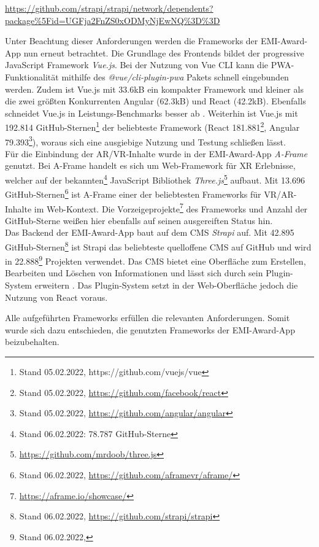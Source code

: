 \urldef\strapidep\url{https://github.com/strapi/strapi/network/dependents?package%5Fid=UGFja2FnZS0xODMyNjEwNQ%3D%3D}

Unter Beachtung dieser Anforderungen werden die Frameworks der EMI-Award-App nun
erneut betrachtet. Die Grundlage des Frontends bildet der progressive JavaScript
Framework \textit{Vue.js}. Bei der Nutzung von Vue CLI kann die
PWA-Funktionalität mithilfe des \textit{@vue/cli-plugin-pwa} Pakets schnell
eingebunden werden. Zudem ist Vue.js mit 33.6kB \cite[{v3.2.29, minifiziert und
            komprimiert}]{Kanodia2022} ein kompakter Framework und kleiner als die zwei
größten Konkurrenten Angular (62.3kB) und React (42.2kB). Ebenfalls schneidet
Vue.js in Leistungs-Benchmarks besser ab \cite{Krause2022}. Weiterhin ist Vue.js
mit 192.814 GitHub-Sternen\footnote{Stand 05.02.2022,
    https://github.com/vuejs/vue} der beliebteste Framework (React
181.881\footnote{Stand 05.02.2022, \url{https://github.com/facebook/react}},
Angular 79.393\footnote{Stand 05.02.2022,
    \url{https://github.com/angular/angular}}), woraus sich eine ausgiebige Nutzung
und Testung schließen lässt. \\
Für die Einbindung der \ac{AR}/\ac{VR}-Inhalte wurde in der EMI-Award-App
\textit{A-Frame} genutzt. Bei A-Frame handelt es sich um Web-Framework für
\ac{XR} Erlebnisse, welcher auf der bekannten\footnote{Stand 06.02.2022: 78.787
    GitHub-Sterne} JavaScript Bibliothek \textit{Three.js}\footnote{\url{https://github.com/mrdoob/three.js}} aufbaut. Mit 13.696
GitHub-Sternen\footnote{Stand 06.02.2022,
    \url{https://github.com/aframevr/aframe/}} ist A-Frame einer der beliebtesten
Frameworks für \ac{VR}/\ac{AR}-Inhalte im Web-Kontext. Die Vorzeigeprojekte\footnote{\url{https://aframe.io/showcase/}} des Frameworks und Anzahl der
GitHub-Sterne weißen hier ebenfalls auf seinen ausgereiften Status hin. \\
Das Backend der EMI-Award-App baut auf dem \ac{CMS} \textit{Strapi} auf. Mit
42.895 GitHub-Sternen\footnote{Stand 06.02.2022,
    \url{https://github.com/strapi/strapi}} ist Strapi das beliebteste quelloffene
\ac{CMS} auf GitHub und wird in 22.888\footnote{Stand 06.02.2022, \strapidep}
Projekten verwendet. Das \ac{CMS} bietet eine Oberfläche zum Erstellen,
Bearbeiten und Löschen von Informationen und lässt sich durch sein Plugin-System
erweitern \cite{Strapi2021}. Das Plugin-System setzt in der Web-Oberfläche
jedoch die Nutzung von React voraus.

Alle aufgeführten Frameworks erfüllen die relevanten Anforderungen. Somit wurde
sich dazu entschieden, die genutzten Frameworks der EMI-Award-App beizubehalten.

